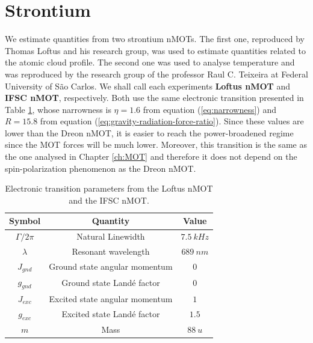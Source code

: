 %
\section{Strontium}
\label{eq:strontium}
%

We estimate quantities from two strontium nMOTs. The first one, reproduced by Thomas Loftus \cite{loftus2004narrow} and his research group, was used to estimate quantities related to the atomic cloud profile. The second one was used to analyse temperature and was reproduced by the research group of the professor Raul C. Teixeira at Federal University of São Carlos. We shall call each experiments \textbf{Loftus nMOT} and \textbf{IFSC nMOT}, respectively. Both use the same electronic transition presented in Table \ref{tab:electronic-transition-St-loftus}, whose narrowness is $ \eta = 1.6 $ from equation (\ref{eq:narrowness}) and $ R = 15.8 $ from equation (\ref{eq:gravity-radiation-force-ratio}). Since these values are lower than the Dreon nMOT, it is easier to reach the power-broadened regime since the MOT forces will be much lower. Moreover, this transition is the same as the one analysed in Chapter \ref{ch:MOT} and therefore it does not depend on the spin-polarization phenomenon as the Dreon nMOT.

\begin{table}[ht!]
    \centering
    \caption{Electronic transition parameters from the Loftus nMOT and the IFSC nMOT.}
    \begin{tabular}{|c|c|c|}
        \hline
        \textbf{Symbol} & \textbf{Quantity} & \textbf{Value} \\ \hline
        $ \Gamma / 2\pi $ & Natural Linewidth & $ 7.5\ kHz $ \\
        $ \lambda $ & Resonant wavelength & $ 689\ nm $ \\
        $ J_{gnd} $ & Ground state angular momentum & $ 0 $ \\
        $ g_{gnd} $ & Ground state Landé factor & $ 0 $ \\
        $ J_{exc} $ & Excited state angular momentum & $ 1 $ \\
        $ g_{exc} $ & Excited state Landé factor & $ 1.5 $ \\
        $ m $ & Mass & $ 88\ u $ \\
        \hline
    \end{tabular}
    \vspace{10px}
    \label{tab:electronic-transition-St-loftus}
\end{table}

